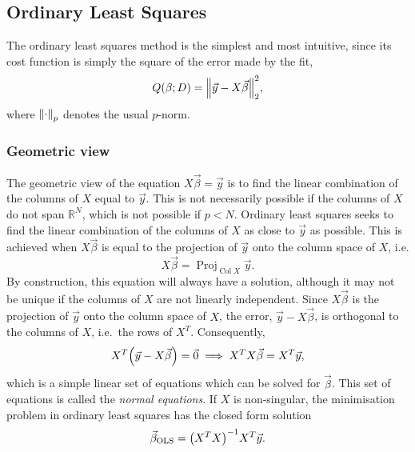 \documentclass[11pt,british,a4paper]{article}
\DeclareMathOperator{\Proj}{Proj}
\DeclareMathOperator{\Col}{Col}
\numberwithin{equation}{section}
\begin{document}
\subsection{Ordinary Least Squares}
The ordinary least squares method is the simplest and most intuitive, since its cost function is simply the square of the error made by the fit,
\begin{equation}
    Q(\beta;D) = \norm{\vec{y}-X\vec{\beta}}_2^2,
\end{equation}
where \(\norm{\cdot}_p\) denotes the usual \(p\)-norm.

\subsubsection{Geometric view}
The geometric view of the equation \(X\vec{\beta}=\vec{y}\) is to find the linear combination of the columns of \(X\) equal to \(\vec{y}\).
This is not necessarily possible if the columns of \(X\) do not span \(\mathbb{R}^N\), which is not possible if \(p<N\).
Ordinary least squares seeks to find the linear combination of the columns of \(X\) as close to \(\vec{y}\) as possible.
This is achieved when \(X\vec{\beta}\) is equal to the projection of \(\vec{y}\) onto the column space of \(X\), i.e.
\begin{equation}
    X\vec{\beta} = \Proj_{\Col{X}}{\vec{y}}.
\end{equation}
By construction, this equation will always have a solution, although it may not be unique if the columns of \(X\) are not linearly independent.
Since \(X\vec{\beta}\) is the projection of \(\vec{y}\) onto the column space of \(X\), the error, \(\vec{y}-X\vec{\beta}\), is orthogonal to the columns of \(X\), i.e.\ the rows of \(X^T\).
Consequently,
\begin{equation}
    X^T\qty(\vec{y}-X\vec{\beta}) = \vec{0}
    \implies
    X^T X \vec{\beta} = X^T \vec{y},\label{eq:olsnormal}
\end{equation}
which is a simple linear set of equations which can be solved for \(\vec{\beta}\).
This set of equations is called the \emph{normal equations}.
If \(X\) is non-singular, the minimisation problem in ordinary least squares has the closed form solution
\begin{equation}
    \vec{\beta}_{\text{OLS}} = \qty(X^T X)^{-1} X^T \vec{y}.
\end{equation}
\end{document}
